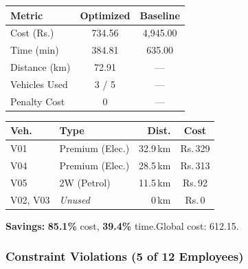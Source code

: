 \documentclass[11pt,a4paper]{article}
\newcommand{\rupee}{Rs.}
\newcommand{\saving}[1]{\textcolor{velgreen}{\textbf{#1}}}
\begin{document}
\begin{minipage}[t]{0.48\textwidth}
\begin{table}[H]
\centering
\begin{tabular}{lcc}
\toprule
\textbf{Metric} & \textbf{Optimized} & \textbf{Baseline} \\
\midrule
\rowcolor{rowalt}
Cost (\rupee) & 734.56 & 4,945.00 \\
Time (min) & 384.81 & 635.00 \\
\rowcolor{rowalt}
Distance (km) & 72.91 & --- \\
Vehicles Used & 3 / 5 & --- \\
\rowcolor{rowalt}
Penalty Cost & 0 & --- \\
\bottomrule
\end{tabular}
\end{table}
\end{minipage}
\hfill
\begin{minipage}[t]{0.48\textwidth}
\begin{table}[H]
\centering
\begin{tabular}{llrc}
\toprule
\textbf{Veh.} & \textbf{Type} & \textbf{Dist.} & \textbf{Cost} \\
\midrule
\rowcolor{rowalt}
V01 & Premium (Elec.) & 32.9\,km & \rupee\,329 \\
V04 & Premium (Elec.) & 28.5\,km & \rupee\,313 \\
\rowcolor{rowalt}
V05 & 2W (Petrol) & 11.5\,km & \rupee\,92 \\
V02, V03 & \textit{Unused} & 0\,km & \rupee\,0 \\
\bottomrule
\end{tabular}
\end{table}
\end{minipage}

\vspace{4pt}
\textbf{Savings:} \saving{85.1\%} cost, \saving{39.4\%} time.\quad Global cost: 612.15.

\subsubsection{Constraint Violations (5 of 12 Employees)}
\end{document}
